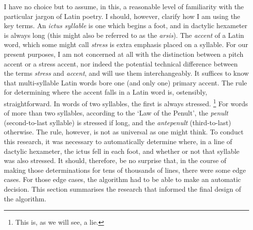 \documentclass[11pt,a4paper]{scrartcl} %
\begin{document}
I have no choice but to assume, in this, a reasonable level of familiarity with the particular jargon of Latin poetry. I should, however, clarify how I am using the key terms. An \textit{ictus syllable} is one which begins a foot, and in dactylic hexameter is always long (this might also be referred to as the \textit{arsis}). The \textit{accent} of a Latin word, which some might call \textit{stress} is extra emphasis placed on a syllable. For our present purposes, I am not concerned at all with the distinction between a pitch accent or a stress accent, nor indeed the potential technical difference between the terms \textit{stress} and \textit{accent}, and will use them interchangeably. It suffices to know that multi-syllable Latin words bore one (and only one) primary accent. The rule for determining where the accent falls in a Latin word is, ostensibly, straightforward. In words of two syllables, the first is always stressed.%
\footnote{This is, as we will see, a lie.}
For words of more than two syllables, according to the `Law of the Penult', the \textit{penult} (second-to-last syllable) is stressed if long, and the \textit{antepenult} (third-to-last) otherwise. The rule, however, is not as universal as one might think. To conduct this research, it was necessary to automatically determine where, in a line of dactylic hexameter, the ictus fell in each foot, and whether or not that syllable was also stressed. It should, therefore, be no surprise that, in the course of making those determinations for tens of thousands of lines, there were some edge cases. For those edge cases, the algorithm had to be able to make an automatic decision. This section summarises the research that informed the final design of the algorithm. 
\end{document}
